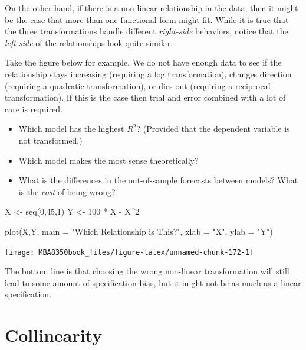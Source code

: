 \documentclass[
]{book}
\newenvironment{Shaded}{\begin{snugshade}}{\end{snugshade}}
\newcommand{\AttributeTok}[1]{\textcolor[rgb]{0.77,0.63,0.00}{#1}}
\newcommand{\DecValTok}[1]{\textcolor[rgb]{0.00,0.00,0.81}{#1}}
\newcommand{\FunctionTok}[1]{\textcolor[rgb]{0.00,0.00,0.00}{#1}}
\newcommand{\NormalTok}[1]{#1}
\newcommand{\OtherTok}[1]{\textcolor[rgb]{0.56,0.35,0.01}{#1}}
\newcommand{\SpecialCharTok}[1]{\textcolor[rgb]{0.00,0.00,0.00}{#1}}
\newcommand{\StringTok}[1]{\textcolor[rgb]{0.31,0.60,0.02}{#1}}
\begin{document}
On the other hand, if there is a non-linear relationship in the data, then it might be the case that more than one functional form might fit. While it is true that the three transformations handle different \emph{right-side} behaviors, notice that the \emph{left-side} of the relationships look quite similar.

Take the figure below for example. We do not have enough data to see if the relationship stays increasing (requiring a log transformation), changes direction (requiring a quadratic transformation), or dies out (requiring a reciprocal transformation). If this is the case then trial and error combined with a lot of care is required.

\begin{itemize}
\item
  Which model has the highest \(R^2\)? (Provided that the dependent variable is not transformed.)
\item
  Which model makes the most sense theoretically?
\item
  What is the differences in the out-of-sample forecasts between models? What is the \emph{cost} of being wrong?
\end{itemize}

\begin{Shaded}
\begin{Highlighting}[]
\NormalTok{X }\OtherTok{\textless{}{-}} \FunctionTok{seq}\NormalTok{(}\DecValTok{0}\NormalTok{,}\DecValTok{45}\NormalTok{,}\DecValTok{1}\NormalTok{)}
\NormalTok{Y }\OtherTok{\textless{}{-}} \DecValTok{100} \SpecialCharTok{*}\NormalTok{ X }\SpecialCharTok{{-}}\NormalTok{ X}\SpecialCharTok{\^{}}\DecValTok{2}

\FunctionTok{plot}\NormalTok{(X,Y,}
     \AttributeTok{main =} \StringTok{"Which Relationship is This?"}\NormalTok{,}
     \AttributeTok{xlab =} \StringTok{"X"}\NormalTok{,}
     \AttributeTok{ylab =} \StringTok{"Y"}\NormalTok{)}
\end{Highlighting}
\end{Shaded}

\begin{center}\texttt{[image: MBA8350book\_files/figure-latex/unnamed-chunk-172-1]} \end{center}

The bottom line is that choosing the wrong non-linear transformation will still lead to some amount of specification bias, but it might not be as much as a linear specification.

\hypertarget{collinearity}{%
\section{Collinearity}\label{collinearity}}
\end{document}
